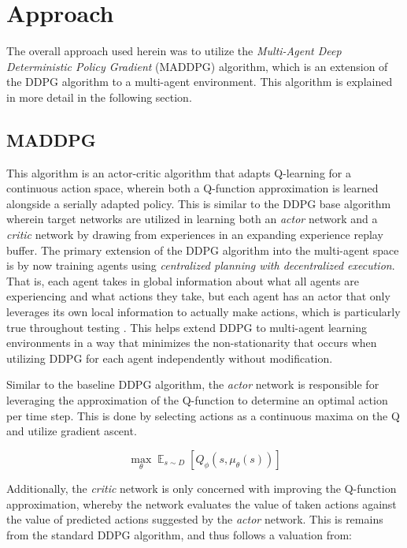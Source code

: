 \documentclass[11pt]{article}
\begin{document}
	\section{Approach}
	
	The overall approach used herein was to utilize the \textit{Multi-Agent Deep Deterministic Policy Gradient} (MADDPG) algorithm, which is an extension of the DDPG algorithm to a multi-agent environment. This algorithm is explained in more detail in the following section.
	
	\subsection{MADDPG}
	
	This algorithm is an actor-critic algorithm that adapts Q-learning for a continuous action space, wherein both a Q-function approximation is learned alongside a serially adapted policy. This is similar to the DDPG base algorithm wherein target networks are utilized in learning both an \textit{actor} network and a \textit{critic} network by drawing from experiences in an expanding experience replay buffer. The primary extension of the DDPG algorithm into the multi-agent space is by now training agents using \textit{centralized planning with decentralized execution}. That is, each agent takes in global information about what all agents are experiencing and what actions they take, but each agent has an actor that only leverages its own local information to actually make actions, which is particularly true throughout testing \cite{maddpg}. This helps extend DDPG to multi-agent learning environments in a way that minimizes the non-stationarity that occurs when utilizing DDPG for each agent independently without modification.
	
	Similar to the baseline DDPG algorithm, the \textit{actor} network is responsible for leveraging the approximation of the Q-function to determine an optimal action per time step. This is done by selecting actions as a continuous maxima on the Q and utilize gradient ascent.
	
	\begin{equation}
		\mathop{\mathbb{\text{max}}}_\theta\mathop{\mathbb{E}}_{s\sim D}\left[Q_{\phi}\left(s, \mu_{\theta}(s)\right)\right]
	\end{equation}
	
	Additionally, the \textit{critic} network is only concerned with improving the Q-function approximation, whereby the network evaluates the value of taken actions against the value of predicted actions suggested by the \textit{actor} network. This is remains from the standard DDPG algorithm, and thus follows a valuation from:
	
\end{document}
